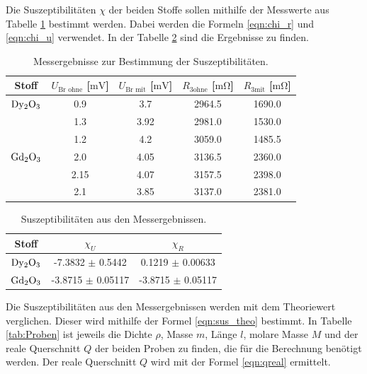 Die Suszeptibilitäten $\chi$ der beiden Stoffe sollen mithilfe der Messwerte aus Tabelle \ref{tab:Messwerte} bestimmt werden.
Dabei werden die Formeln \ref{eqn:chi_r} und \ref{eqn:chi_u} verwendet.
In der Tabelle \ref{tab:Suszeptibilität_Praxis} sind die Ergebnisse zu finden.

\begin{table}
  \centering
  \caption{Messergebnisse zur Bestimmung der Suszeptibilitäten.}
  \label{tab:Messwerte}
  \begin{tabular}{c c c c c}
    \toprule
    {Stoff} & {$U_{\text{Br ohne}}$ [$\si{\milli\volt}$]} & {$U_{\text{Br mit}}$ [$\si{\milli\volt}$]} & {$R_{3 \text{ohne}}$ [$\si{\milli\ohm}$]} &{$R_{3 \text{mit}}$ [$\si{\milli\ohm}$]}\\
    \midrule
    $\ce{Dy2O3}$ & 0.9 & 3.7 & 2964.5 & 1690.0\\
              &1.3 & 3.92 & 2981.0 & 1530.0\\
              &1.2 & 4.2 & 3059.0 & 1485.5 \\
    $\ce{Gd2O3}$ &2.0 & 4.05 & 3136.5 & 2360.0 \\
              &2.15 & 4.07 & 3157.5 & 2398.0 \\
              &2.1 & 3.85 & 3137.0 & 2381.0 \\
    \bottomrule
  \end{tabular}
\end{table}

\begin{table}
  \centering
  \caption{Suszeptibilitäten aus den Messergebnissen.}
  \label{tab:Suszeptibilität_Praxis}
  \begin{tabular}{c c c}
    \toprule
    {Stoff} & {$\chi_U$} & {$\chi_R$} \\
    \midrule
    $\ce{Dy2O3}$ & -7.3832 $\pm$ 0.5442 & 0.1219 $\pm$ 0.00633 \\
    $\ce{Gd2O3}$ & -3.8715 $\pm$ 0.05117 & -3.8715 $\pm$ 0.05117 \\
    \bottomrule
  \end{tabular}
\end{table}

Die Suszeptibilitäten aus den Messergebnissen werden mit dem Theoriewert verglichen.
Dieser wird mithilfe der Formel \ref{eqn:sus_theo} bestimmt.
In Tabelle \ref{tab:Proben} ist jeweils die Dichte $\rho$, Masse $m$, Länge $l$, molare Masse $M$ und der reale Querschnitt $Q$ der beiden Proben zu finden, die für die Berechnung benötigt werden.
Der reale Querschnitt $Q$ wird mit der Formel \ref{eqn:qreal} ermittelt.


